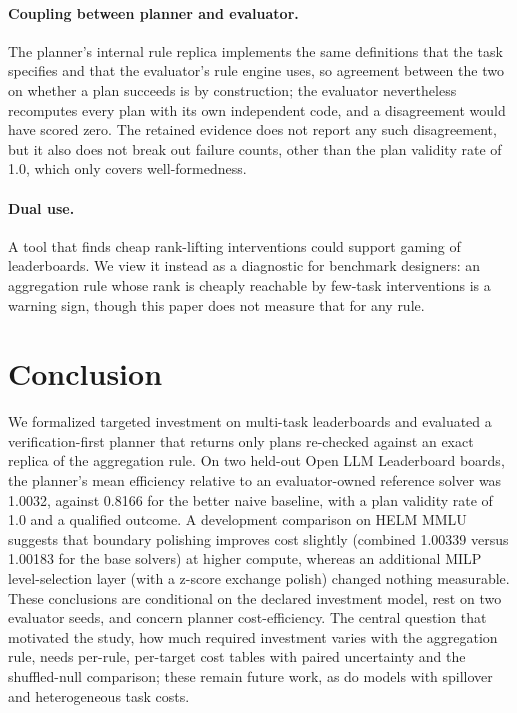 \documentclass{article}
\begin{document}
\paragraph{Coupling between planner and evaluator.} The planner's internal rule replica implements the same definitions that the task specifies and that the evaluator's rule engine uses, so agreement between the two on whether a plan succeeds is by construction; the evaluator nevertheless recomputes every plan with its own independent code, and a disagreement would have scored zero. The retained evidence does not report any such disagreement, but it also does not break out failure counts, other than the plan validity rate of 1.0, which only covers well-formedness.

\paragraph{Dual use.} A tool that finds cheap rank-lifting interventions could support gaming of leaderboards. We view it instead as a diagnostic for benchmark designers: an aggregation rule whose rank is cheaply reachable by few-task interventions is a warning sign, though this paper does not measure that for any rule.

\section{Conclusion}
We formalized targeted investment on multi-task leaderboards and evaluated a verification-first planner that returns only plans re-checked against an exact replica of the aggregation rule. On two held-out Open LLM Leaderboard boards, the planner's mean efficiency relative to an evaluator-owned reference solver was 1.0032, against 0.8166 for the better naive baseline, with a plan validity rate of 1.0 and a qualified outcome. A development comparison on HELM MMLU suggests that boundary polishing improves cost slightly (combined 1.00339 versus 1.00183 for the base solvers) at higher compute, whereas an additional MILP level-selection layer (with a z-score exchange polish) changed nothing measurable. These conclusions are conditional on the declared investment model, rest on two evaluator seeds, and concern planner cost-efficiency. The central question that motivated the study, how much required investment varies with the aggregation rule, needs per-rule, per-target cost tables with paired uncertainty and the shuffled-null comparison; these remain future work, as do models with spillover and heterogeneous task costs.
\end{document}
